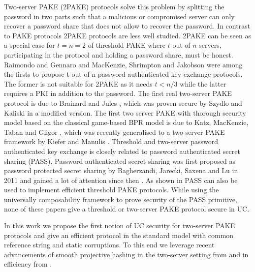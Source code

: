Two-server PAKE (2PAKE) protocols solve this problem by splitting the password in two parts such that a malicious or compromised server can only recover a password share that does not allow to recover the password.
In contrast to PAKE protocols 2PAKE protocols are less well studied.
2PAKE can be seen as a special case for $t=n=2$ of threshold PAKE where $t$ out of $n$ servers, participating in the protocol and holding a password share, must be honest.
Raimondo and Gennaro \cite{Raimondo_Gennaro_2003} and MacKenzie, Shrimpton and Jakobson \cite{MacKenzie_Shrimpton_Jakobsson_2002} were among the firsts to propose t-out-of-n password authenticated key exchange protocols.
The former is not suitable for 2PAKE as it needs $t<n/3$ while the latter requires a PKI in addition to the password.
The first real two-server PAKE protocol is due to Brainard and Jules \cite{Brainard_Juels_2003}, which was proven secure by Szydlo and Kaliski \cite{SzydloK05} in a modified version.
The first two server PAKE with thorough security model based on the classical game-based BPR model is due to Katz, MacKenzie,  Taban and Gligor \cite{KatzMTB05}, which was recently generalised to a two-server PAKE framework by Kiefer and Manulis \cite{KieferM14a}.
Threshold and two-server password authenticated key exchange is closely related to password authenticated secret sharing (PASS).
Password authenticated secret sharing was first proposed as password protected secret sharing by Bagherzandi, Jarecki, Saxena and Lu in 2011 \cite{Bagherzandi2011} and gained a lot of attention since then \cite{Camenisch_Lysyanskaya_Neven_2012,JareckiKK14,CamenishEN15}.
As shown in \cite{JareckiKK14} PASS can also be used to implement efficient threshold PAKE protocols.
While using the universally composability framework to prove security of the PASS primitive, none of these papers give a threshold or two-server PAKE protocol secure in UC.

In this work we propose the first notion of UC security for two-server PAKE protocols and give an efficient protocol in the standard model with common reference string and static corruptions.
To this end we leverage recent advancements of smooth projective hashing in the two-server setting from \cite{KieferM14a} and in efficiency from \cite{Benhamouda2013}.



